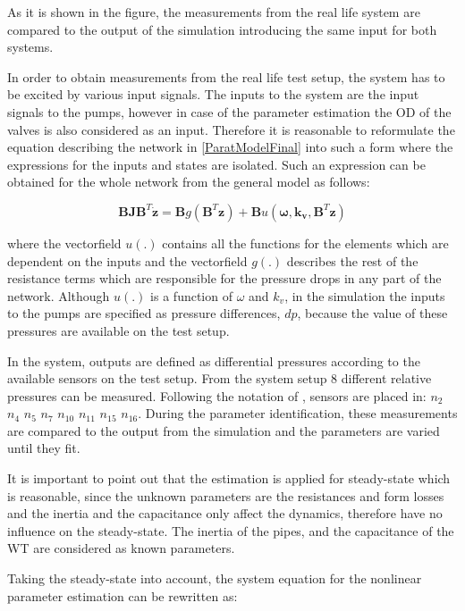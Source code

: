 As it is shown in the figure, the measurements from the real life system are compared to the output of the simulation introducing the same input for both systems. 

In order to obtain measurements from the real life test setup, the system has to be excited by various input signals. The inputs to the system are the input signals to the pumps, however in case of the parameter estimation the OD of the valves is also considered as an input. Therefore it is reasonable to reformulate the equation describing the network in \eqref{ParatModelFinal} into such a form where the expressions for the inputs and states are isolated. Such an expression can be obtained for the whole network from the general model as follows: 

\begin{equation}
 \pmb{B}\pmb{J {B}}^T \pmb{\dot{z}} = \pmb{B} g(\pmb{B}^T \pmb{z})+ \pmb{B} u(\pmb{\omega},\pmb{k_v	}, \pmb{B}^T \pmb{z})
 \label{InputOutputmodel}
\end{equation}

where the vectorfield $u(.)$ contains all the functions for the elements which are dependent on the inputs and the vectorfield $g(.)$ describes the rest of the resistance terms which are responsible for the pressure drops in any part of the network. Although $u(.)$ is a function of $\omega$ and $k_v$, in the simulation the inputs to the pumps are specified as pressure differences, $dp$, because the value of these pressures are available on the test setup. 

In the system, outputs are defined as differential pressures according to the available sensors on the test setup. From the system setup $8$ different relative pressures can be measured. Following the notation of , sensors are placed in: 
$n_2$ $n_4$ $n_5$ $n_7$ $n_{10}$ $n_{11}$ $n_{15}$ $n_{16}$. During the parameter identification, these measurements are compared to the output from the simulation and the parameters are varied until they fit.

It is important to point out that the estimation is applied for steady-state which is reasonable, since the unknown parameters are the resistances and form losses and the inertia and the capacitance only affect the dynamics, therefore have no influence on the steady-state. The inertia of the pipes, and the capacitance of the WT are considered as known parameters. 

Taking the steady-state into account, the system equation for the nonlinear parameter estimation can be rewritten as: 


